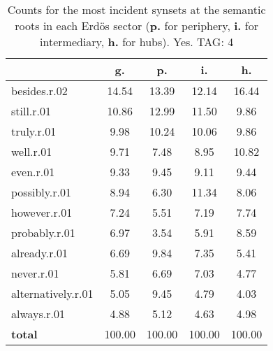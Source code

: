 \begin{table}[h!]
\begin{center}
\begin{tabular}{| l || c | c | c | c |}\hline
 & {\bf g.} & {\bf p.} & {\bf i.} & {\bf h.} \\\hline\hline
besides.r.02 & 14.54  & 13.39  & 12.14  & 16.44 \\\hline
still.r.01 & 10.86  & 12.99  & 11.50  & 9.86 \\\hline
truly.r.01 & 9.98  & 10.24  & 10.06  & 9.86 \\\hline
well.r.01 & 9.71  & 7.48  & 8.95  & 10.82 \\\hline
even.r.01 & 9.33  & 9.45  & 9.11  & 9.44 \\\hline
possibly.r.01 & 8.94  & 6.30  & 11.34  & 8.06 \\\hline
however.r.01 & 7.24  & 5.51  & 7.19  & 7.74 \\\hline
probably.r.01 & 6.97  & 3.54  & 5.91  & 8.59 \\\hline
already.r.01 & 6.69  & 9.84  & 7.35  & 5.41 \\\hline
never.r.01 & 5.81  & 6.69  & 7.03  & 4.77 \\\hline
alternatively.r.01 & 5.05  & 9.45  & 4.79  & 4.03 \\\hline
always.r.01 & 4.88  & 5.12  & 4.63  & 4.98 \\\hline\hline
{{\bf total}} & 100.00  & 100.00  & 100.00  & 100.00 \\\hline
\end{tabular}
\caption{Counts for the most incident synsets at the semantic roots in each Erd\"os sector ({\bf p.} for periphery, {\bf i.} for intermediary, {\bf h.} for hubs). Yes. TAG: 4}
\end{center}
\end{table}